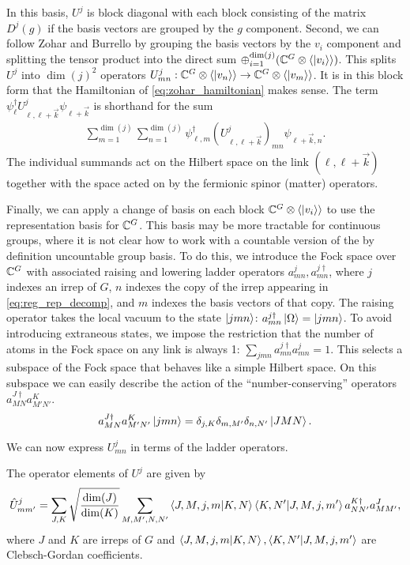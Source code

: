\documentclass[10pt,reqno]{amsart}
\numberwithin{equation}{section}
\begin{document}
	In this basis, $U^j$ is block diagonal with each block consisting of the matrix $D^j(g)$ if the basis vectors are grouped by the $g$ component. 
	Second, we can follow Zohar and Burrello by grouping the basis vectors by the $v_i$ component and splitting the tensor product into the direct sum $\oplus_{i=1}^{\dim(j)}(\mathbb{C}^G \otimes \langle \ket{v_i}\rangle)$.
	This splits $U^j$ into $\dim(j)^2$ operators $U^j_{mn}: \mathbb{C}^G \otimes \langle \ket{v_n}\rangle \to \mathbb{C}^G \otimes \langle \ket{v_m}\rangle$.
	It is in this block form that the Hamiltonian of \cref{eq:zohar_hamiltonian} makes sense. 
	The term $\psi^\dagger_\ell U^j_{\ell,\ell+\vec{k}} \psi_{\ell +\vec{k}}$ is shorthand for the sum
	\begin{align}
		\sum_{m=1}^{\dim(j)}\sum_{n=1}^{\dim(j)} \psi^\dagger_{\ell,m} (U^j_{\ell,\ell+\vec{k}})_{mn} \psi_{\ell +\vec{k},n}.
	\end{align}
	The individual summands act on the Hilbert space on the link $(\ell,\ell+\vec{k})$ together with the space acted on by the fermionic spinor (matter) operators.
	
	Finally, we can apply a change of basis on each block $\mathbb{C}^G \otimes \langle \ket{v_i}\rangle$ to use the representation basis for $\mathbb{C}^G$.
	This basis may be more tractable for continuous groups, where it is not clear how to work with a countable version of the by definition uncountable group basis. 
	To do this, we introduce the Fock space over $\mathbb{C}^G$ with associated raising and lowering ladder operators $a^j_{mn}, a^{j\dagger}_{mn}$, where $j$ indexes an irrep of $G$, $n$ indexes the copy of the irrep appearing in \cref{eq:reg_rep_decomp}, and $m$ indexes the basis vectors of that copy.
	The raising operator takes the local vacuum to the state $\ket{jmn}$: $a^{j\dagger}_{mn} \ket{\Omega} = \ket{jmn}$.
	To avoid introducing extraneous states, we impose the restriction that the number of atoms in the Fock space on any link is always 1: $\sum_{jmn} a^{j\dagger}_{mn} a^j_{mn} =1$.
	This selects a subspace of the Fock space that behaves like a simple Hilbert space.
	On this subspace we can easily describe the action of the ``number-conserving'' operators $a^{J\dagger}_{MN}a^{K}_{M'N'}$.
	\begin{equation}
		a^{J\dagger}_{MN}a^{K}_{M'N'}\ket{jmn} = \delta_{j,K}\delta_{m,M'}\delta_{n,N'}\ket{JMN}.
	\end{equation}
	
	We can now express $U^j_{mn}$ in terms of the ladder operators.
	\begin{proposition}\label{prop:Uj_ops}
		The operator elements of $U^j$ are given by
		\[\hat{U}^j_{mm'}= \sum_{J,K} \sqrt{\frac{\dim(J)}{\dim(K)}} \sum_{M,M',N,N'}\braket{J,M,j,m}{K,N} \braket{K, N'}{J,M,j,m'} a^{K\dagger}_{NN'} a^J_{MM'}, \]
		where $J$ and $K$ are irreps of $G$ and $\braket{J,M,j,m}{K,N}, \braket{K, N'}{J,M,j,m'}$ are Clebsch-Gordan coefficients.
	\end{proposition}
	
\end{document}
